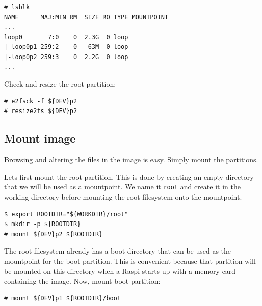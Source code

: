 \begin{lstlisting}[]
# lsblk
NAME      MAJ:MIN RM  SIZE RO TYPE MOUNTPOINT
...
loop0       7:0    0  2.3G  0 loop 
|-loop0p1 259:2    0   63M  0 loop 
|-loop0p2 259:3    0  2.2G  0 loop
...
\end{lstlisting}
\FloatBarrier
\vspace{-5mm}

Check and resize the root partition:
\begin{lstlisting}[]
# e2fsck -f ${DEV}p2
# resize2fs ${DEV}p2
\end{lstlisting}
\FloatBarrier



\subsection{Mount image}

Browsing and altering the files in the image is easy. Simply mount the partitions.

Lets first mount the root partition. This is done by creating an empty directory
that we will be used as a mountpoint. We name it \texttt{root} and create it in the
working directory before mounting the root filesystem onto the mountpoint.

\begin{lstlisting}[]
$ export ROOTDIR="${WORKDIR}/root"
$ mkdir -p ${ROOTDIR}
# mount ${DEV}p2 ${ROOTDIR}
\end{lstlisting}
\FloatBarrier
\vspace{-5mm}

The root filesystem already has a boot directory that can be used as
the mountpoint for the boot partition.
This is convenient because that partition will be mounted
on this directory when a \ac{Raspi} starts up with a memory card containing
the image. %
Now, mount boot partition:
\begin{lstlisting}[]
# mount ${DEV}p1 ${ROOTDIR}/boot
\end{lstlisting}
\FloatBarrier
\vspace{-5mm}

